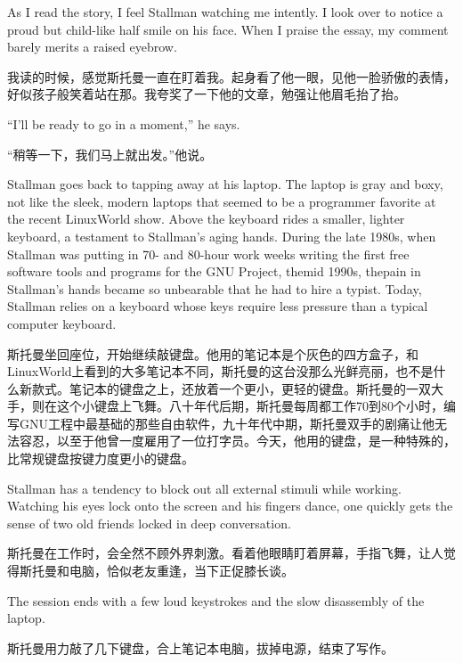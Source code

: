 \ifdefined\eng
As I read the story, I feel Stallman watching me intently. I look over to notice a proud but child-like half smile on his face. When I praise the essay, my comment barely merits a raised eyebrow.
\fi

\ifdefined\chs
我读的时候，感觉斯托曼一直在盯着我。起身看了他一眼，见他一脸骄傲的表情，好似孩子般笑着站在那。我夸奖了一下他的文章，勉强让他眉毛抬了抬。
\fi

\ifdefined\eng
``I'll be ready to go in a moment,'' he says.
\fi

\ifdefined\chs
``稍等一下，我们马上就出发。''他说。
\fi

\ifdefined\eng
Stallman goes back to tapping away at his laptop. The laptop is gray and boxy, not like the sleek, modern laptops that seemed to be a programmer favorite at the recent LinuxWorld show. Above the keyboard rides a smaller, lighter keyboard, a testament to Stallman's aging hands. During the \ifdefined\vone late 1980s, when Stallman was putting in 70- and 80-hour work weeks writing the first free software tools and programs for the GNU Project, the\fi\ifdefined\vtwo mid 1990s, the\fi pain in Stallman's hands became so unbearable that he had to hire a typist. Today, Stallman relies on a keyboard whose keys require less pressure than a typical computer keyboard.
\fi

\ifdefined\chs
斯托曼坐回座位，开始继续敲键盘。他用的笔记本是个灰色的四方盒子，和LinuxWorld上看到的大多笔记本不同，斯托曼的这台没那么光鲜亮丽，也不是什么新款式。笔记本的键盘之上，还放着一个更小，更轻的键盘。斯托曼的一双大手，则在这个小键盘上飞舞。\ifdefined\vone 八十年代后期，斯托曼每周都工作70到80个小时，编写GNU工程中最基础的那些自由软件，\fi\ifdefined\vtwo 九十年代中期，斯托曼\fi 双手的剧痛让他无法容忍，以至于他曾一度雇用了一位打字员。今天，他用的键盘，是一种特殊的，比常规键盘按键力度更小的键盘。
\fi

\ifdefined\eng
Stallman has a tendency to block out all external stimuli while working. Watching his eyes lock onto the screen and his fingers dance, one quickly gets the sense of two old friends locked in deep conversation.
\fi

\ifdefined\chs
斯托曼在工作时，会全然不顾外界刺激。看着他眼睛盯着屏幕，手指飞舞，让人觉得斯托曼和电脑，恰似老友重逢，当下正促膝长谈。
\fi

\ifdefined\eng
The session ends with a few loud keystrokes and the slow disassembly of the laptop.
\fi

\ifdefined\chs
斯托曼用力敲了几下键盘，合上笔记本电脑，拔掉电源，结束了写作。
\fi

